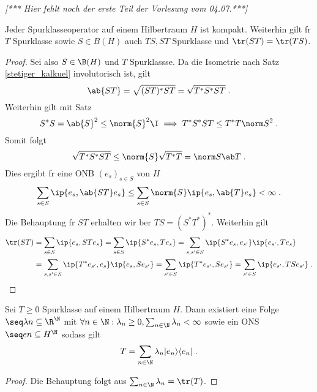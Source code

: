 \textit{[*** Hier fehlt noch der erste Teil der Vorlesung vom 04.07.***]}
\begin{theorem}
	Jeder Spurklasseoperator auf einem Hilbertraum $H$ ist kompakt. Weiterhin gilt f\us r $T$ Spurklasse sowie \(S \in B(H)\) auch \(TS, ST\) Spurklasse und \(\tr (ST) = \tr(TS)\).
\end{theorem}
\begin{proof}
	Sei also \(S\in \B(H)\) und $T$ Spurklassse.  Da die Isometrie nach Satz \ref{stetiger_kalkuel} involutorisch ist, gilt
	\[\ab{ST} = \sqrt{(ST)^*ST} = \sqrt{T^*S^*ST}\;.\]
	Weiterhin gilt mit Satz 
	\[S^*S = \ab{S}^2  \leq \norm{S}^2 \I \implies T^* S^* ST \leq T^*T\norm S^2 \;.\]
	Somit folgt
	\[\sqrt{T^*S^*ST} \leq \norm{S} \sqrt{T^*T} = \norm S \ab T\;.\]	
	Dies ergibt f\us r eine ONB \((e_s)_{s\in S}\) von $H$
	\[\sum_{s\in S}\ip{e_s, \ab{ST} e_s} \leq \sum_{s\in S} \norm{S} \ip{e_s, \ab{T}e_s} < \infty\;.\]
	Die Behauptung f\us r $ST$ erhalten wir \us ber \(TS = (S^*T^*)^*\). Weiterhin gilt
	\begin{align*}\tr(ST) &= \sum_{s\in S} \ip{e_s, ST e_s} = \sum_{s\in S} \ip {S^* e_s, T e_s} = \sum_{s, s' \in S}\ip{S^* e_s, e_{s'}}\ip{e_{s'}, Te_s} \\
		&= \sum_{s, s' \in S}\ip{T^* e_{s'}, e_s}\ip{e_s, Se_{s'}} = \sum_{s'\in S} \ip{T^* e_{s'}, S e_{s'}} = \sum_{s'\in S} \ip {e_{s'}, TS e_{s'}}\;.
		\end{align*}
\end{proof}
\begin{theorem}
	Sei \(T\geq 0\) Spurklasse auf einem Hilbertraum $H$. Dann existiert eine Folge \(\seq \lambda n \subseteq \R^\N\) mit \( \forall n\in\N: \lambda_n \geq 0, \sum_{n\in\N} \lambda_n <\infty\) sowie ein ONS \(\seq en \subseteq H^\N\) sodass gilt
	\[ T = \sum_{n\in\N} \lambda_n|e_n\rangle \langle e_n|\;.\]
	\label{spurklasse_geq0_Folge}
\end{theorem}
\begin{proof}
	Die Behauptung folgt aus \(\sum_{n\in\N} \lambda_n = \tr(T)\).
\end{proof}